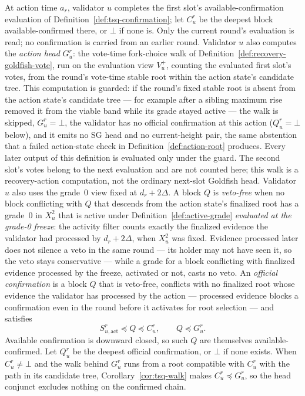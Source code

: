 \begin{definition}
\label{def:official-confirmation}
At action time \(a_r\), validator \(u\) completes the first slot's
available-confirmation evaluation of
Definition~\ref{def:tsq-confirmation}; let \(C_u^r\) be the deepest block
available-confirmed there, or \(\bot\) if none is.  Only the current
round's evaluation is read; no confirmation is carried from an earlier
round.  Validator \(u\) also computes the \emph{action head} \(G_u^r\): the
vote-time fork-choice walk of Definition~\ref{def:recovery-goldfish-vote},
run on the evaluation view \(V_u^+\), counting the evaluated first slot's
votes, from the round's vote-time stable root within the action state's
candidate tree.  This computation is guarded: if the round's fixed stable
root is absent from the action state's candidate tree --- for example
after a sibling maximum rise removed it from the viable band while its
grade stayed active --- the walk is skipped, \(G_u^r=\bot\), the
validator has no official confirmation at this action
(\(Q_u^r=\bot\) below), and it emits no SG head and no current-height
pair, the same abstention that a failed action-state check in
Definition~\ref{def:action-root} produces.  Every later output of this
definition is evaluated only under the guard.  The second slot's votes belong to the next evaluation and
are not counted here; this walk is a recovery-action computation, not the
ordinary next-slot Goldfish head.  Validator \(u\) also uses the grade~0
view fixed at \(d_r+2\Delta\).  A block \(Q\) is
\emph{veto-free} when no block conflicting with \(Q\) that descends from the
action state's finalized root has a grade~0 in \(X_u^2\) that is active
under Definition~\ref{def:active-grade} \emph{evaluated at the grade-0
freeze}: the activity filter counts exactly the finalized evidence the
validator had processed by \(d_r+2\Delta\), when \(X_u^2\) was fixed.
Evidence processed later does not silence a veto in the same round ---
its holder may not have seen it, so the veto stays conservative --- while
a grade for a block conflicting with finalized evidence processed by the
freeze, activated or not, casts no veto.  An
\emph{official confirmation} is a block \(Q\) that is
veto-free, conflicts with no finalized root whose evidence the validator
has processed by the action --- processed evidence blocks a confirmation
even in the round before it activates for root selection --- and satisfies
\[
 S_{u,\mathrm{act}}^r\preceq Q\preceq C_u^r,\qquad Q\preceq G_u^r.
\]
Available confirmation is downward closed, so such \(Q\) are themselves
available-confirmed.  Let \(Q_u^r\) be the deepest official confirmation,
or \(\bot\) if none exists.  When \(C_u^r\neq\bot\) and the walk behind
\(G_u^r\) runs from a root compatible with \(C_u^r\) with the path in its
candidate tree, Corollary~\ref{cor:tsq-walk} makes \(C_u^r\preceq G_u^r\),
so the head conjunct excludes nothing on the confirmed chain.


\end{definition}
